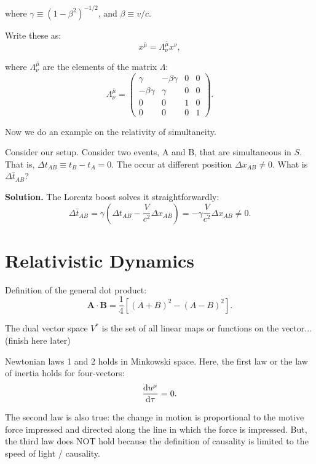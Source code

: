 \documentclass[10pt]{article}
\begin{document}
	where $\gamma \equiv \left( 1-\beta^{2} \right) ^{-1 / 2}$, and $\beta \equiv v / c$. 

	Write these as:
	\begin{equation}
	  x^{\bar{\mu}} = \Lambda^{\bar{\mu}}_{\nu} x^{\nu},
	\end{equation}

	where $\Lambda^{\bar{\mu}}_{\nu}$ are the elements of the matrix $\Lambda$:
	\begin{equation}
	  \Lambda ^{\bar{\mu}}_{\nu} = \begin{pmatrix} 
		  \gamma & -\beta \gamma & 0 & 0 \\
		  -\beta \gamma & \gamma & 0 & 0 \\
		  0 & 0 & 1 & 0 \\ 0 & 0 & 0 & 1 
	  \end{pmatrix}.
	\end{equation}

	Now we do an example on the relativity of simultaneity.
	\begin{exercise}
		Consider our setup. Consider two events, A and B, that are simultaneous in $S$. That is, $\Delta t_{AB} \equiv t_{B} - t_{A}=0$. The occur at different position $\Delta x_{AB} \neq 0$. What is $\Delta \bar{t}_{AB}$?
		
		\vspace{1\baselineskip}
		\textbf{Solution.} The Lorentz boost solves it straightforwardly:
		\begin{equation}
		  \Delta \bar{t}_{AB} = \gamma \left( \Delta t_{AB} - \frac{V}{c^{2}} \Delta x_{AB}\right) = - \gamma \frac{V}{c^{2}} \Delta x_{AB} \neq 0.
		\end{equation}
	\end{exercise}

	\section{Relativistic Dynamics}
	Definition of the general dot product:
	\begin{equation}
	  \mathbf{A} \cdot \mathbf{B} = \frac{1}{4} \left[ (A+B)^{2} - (A-B)^{2} \right].
	\end{equation}

	The dual vector space $V^{*}$ is the set of all linear maps or functions on the vector...(finish here later)

	\vspace{2\baselineskip}
	Newtonian laws 1 and 2 holds in Minkowski space. Here, the first law or the law of inertia holds for four-vectors:
	\begin{equation}
	  \dv{u^{\mu}}{\tau} = 0.
	\end{equation}

	The second law is also true: the change in motion is proportional to the motive force impressed and directed along the line in which the force is impressed. But, the third law does NOT hold because the definition of causality is limited to the speed of light / causality.

	
\end{document}
